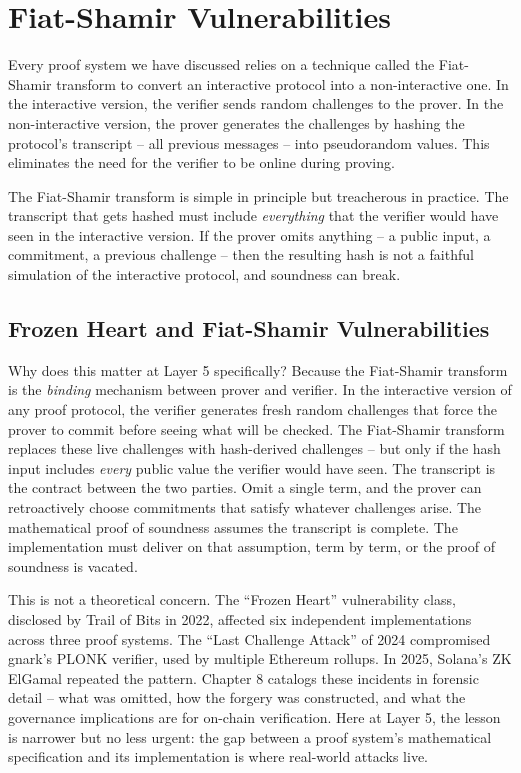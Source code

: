\documentclass[
  11pt,
  openany]{report}
\begin{document}
\section{Fiat-Shamir Vulnerabilities}\label{fiat-shamir-vulnerabilities}

Every proof system we have discussed relies on a technique called the
Fiat-Shamir transform to convert an interactive protocol into a non-interactive
one. In the interactive version, the verifier sends random challenges to the
prover. In the non-interactive version, the prover generates the challenges by
hashing the protocol's transcript -- all previous messages -- into pseudorandom
values. This eliminates the need for the verifier to be online during proving.

The Fiat-Shamir transform is simple in principle but treacherous in practice.
The transcript that gets hashed must include \emph{everything} that the verifier
would have seen in the interactive version. If the prover omits anything -- a
public input, a commitment, a previous challenge -- then the resulting hash is
not a faithful simulation of the interactive protocol, and soundness can break.

\subsection{Frozen Heart and Fiat-Shamir
Vulnerabilities}\label{frozen-heart-and-fiat-shamir-vulnerabilities}

Why does this matter at Layer 5 specifically? Because the Fiat-Shamir transform
is the \emph{binding} mechanism between prover and verifier. In the interactive
version of any proof protocol, the verifier generates fresh random challenges
that force the prover to commit before seeing what will be checked. The
Fiat-Shamir transform replaces these live challenges with hash-derived
challenges -- but only if the hash input includes \emph{every} public value the
verifier would have seen. The transcript is the contract between the two
parties. Omit a single term, and the prover can retroactively choose commitments
that satisfy whatever challenges arise. The mathematical proof of soundness
assumes the transcript is complete. The implementation must deliver on that
assumption, term by term, or the proof of soundness is vacated.

This is not a theoretical concern. The ``Frozen Heart'' vulnerability class,
disclosed by Trail of Bits in 2022, affected six independent implementations
across three proof systems. The ``Last Challenge Attack'' of 2024 compromised
gnark's PLONK verifier, used by multiple Ethereum rollups. In 2025, Solana's ZK
ElGamal repeated the pattern. Chapter 8 catalogs these incidents in forensic
detail -- what was omitted, how the forgery was constructed, and what the
governance implications are for on-chain verification. Here at Layer 5, the
lesson is narrower but no less urgent: the gap between a proof system's
mathematical specification and its implementation is where real-world attacks
live.
\end{document}
